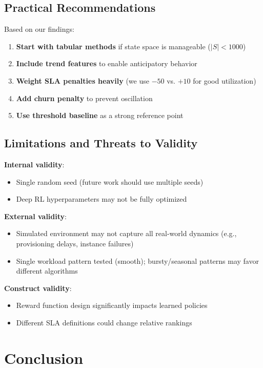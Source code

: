 \documentclass[conference]{IEEEtran}
\begin{document}
\subsection{Practical Recommendations}
Based on our findings:

\begin{enumerate}
    \item \textbf{Start with tabular methods} if state space is manageable ($|S| < 1000$)
    \item \textbf{Include trend features} to enable anticipatory behavior
    \item \textbf{Weight SLA penalties heavily} (we use $-50$ vs. $+10$ for good utilization)
    \item \textbf{Add churn penalty} to prevent oscillation
    \item \textbf{Use threshold baseline} as a strong reference point
\end{enumerate}

\subsection{Limitations and Threats to Validity}

\textbf{Internal validity}:
\begin{itemize}
    \item Single random seed (future work should use multiple seeds)
    \item Deep RL hyperparameters may not be fully optimized
\end{itemize}

\textbf{External validity}:
\begin{itemize}
    \item Simulated environment may not capture all real-world dynamics (e.g., provisioning delays, instance failures)
    \item Single workload pattern tested (smooth); bursty/seasonal patterns may favor different algorithms
\end{itemize}

\textbf{Construct validity}:
\begin{itemize}
    \item Reward function design significantly impacts learned policies
    \item Different SLA definitions could change relative rankings
\end{itemize}

\section{Conclusion}
\end{document}
